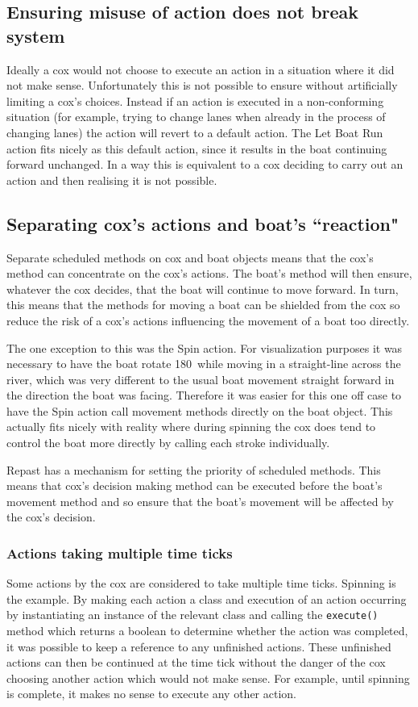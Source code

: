     \subsection{Ensuring misuse of action does not break system}
      Ideally a cox would not choose to execute an action in a situation where it did not make sense. Unfortunately this is not possible to ensure without artificially limiting a cox's choices. Instead if an action is executed in a non-conforming situation (for example, trying to change lanes when already in the process of changing lanes) the action will revert to a default action. The Let Boat Run action fits nicely as this default action, since it results in the boat continuing forward unchanged. In a way this is equivalent to a cox deciding to carry out an action and then realising it is not possible.

    \subsection{Separating cox's actions and boat's ``reaction"}
    Separate scheduled methods on cox and boat objects means that the cox's method can concentrate on the cox's actions. The boat's method will then ensure, whatever the cox decides, that the boat will continue to move forward. In turn, this means that the methods for moving a boat can be shielded from the cox so reduce the risk of a cox's actions influencing the movement of a boat too directly. 
    
    The one exception to this was the Spin action. For visualization purposes it was necessary to have the boat rotate 180\textdegree\ while moving in a straight-line across the river, which was very different to the usual boat movement straight forward in the direction the boat was facing. Therefore it was easier for this one off case to have the Spin action call movement methods directly on the boat object. This actually fits nicely with reality where during spinning the cox does tend to control the boat more directly by calling each stroke individually.

      Repast has a mechanism for setting the priority of scheduled methods. This means that cox's decision making method can be executed before the boat's movement method and so ensure that the boat's movement will be affected by the cox's decision.

      \subsubsection{Actions taking multiple time ticks}
      Some actions by the cox are considered to take multiple time ticks. Spinning is the example. By making each action a class and execution of an action occurring by instantiating an instance of the relevant class and calling the \texttt{execute()} method which returns a boolean to determine whether the action was completed, it was possible to keep a reference to any unfinished actions. These unfinished actions can then be continued at the time tick without the danger of the cox choosing another action which would not make sense. For example, until spinning is complete, it makes no sense to execute any other action.
  
